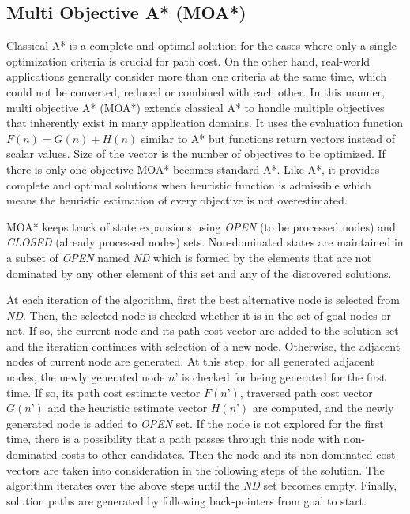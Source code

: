\subsection{Multi Objective A* (MOA*)}

Classical A* \cite{AStarHart:1968} is a complete and optimal solution for the cases where only a single optimization criteria is crucial for path cost. On the other hand, real-world applications generally consider more than one criteria at the same time, which could not be converted, reduced or combined with each other. In this manner, multi objective A* (MOA*) \cite{MOAStewart:1991} extends classical A* to handle multiple objectives that inherently exist in many application domains. It uses the evaluation function $F(n) = G(n) + H(n)$ similar to A* but functions return vectors instead of scalar values. Size of the vector is the number of objectives to be optimized. If there is only one objective MOA* becomes standard A*. Like A*, it provides complete and optimal solutions when heuristic function is admissible which means the heuristic estimation of every objective is not overestimated.

MOA* keeps track of state expansions using {\it OPEN} (to be processed nodes) and {\it CLOSED} (already processed nodes) sets. Non-dominated states are maintained in a subset of {\it OPEN} named {\it ND} which is formed by the elements that are not dominated by any other element of this set and any of the discovered solutions.

At each iteration of the algorithm, first the best alternative node is selected from {\it ND}. Then, the selected node is checked whether it is in the set of goal nodes or not. If so, the current node and its path cost vector are added to the solution set and the iteration continues with selection of a new node. Otherwise, the adjacent nodes of current node are generated. At this step, for all generated adjacent nodes, the  newly generated node $n’$ is checked for being generated for the first time. If so, its path cost estimate vector $F(n’)$, traversed path cost vector $G(n’)$ and the heuristic estimate vector $H(n’)$ are computed, and the newly generated node is added to {\it OPEN} set. If the node is not explored for the first time, there is a possibility that a path passes through this node with non-dominated costs to other candidates. Then the node and its non-dominated cost vectors are taken into consideration in the following steps of the solution. The algorithm iterates over the above steps until the {\it ND} set becomes empty. Finally, solution paths are generated by following back-pointers from goal to start. 

